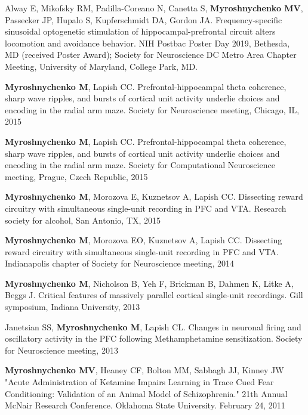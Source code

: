 \documentclass[10pt]{article}
\makeatletter
\newlength{\bibhang}
\newlength{\bibsep}
 {\@listi \global\bibsep\itemsep \global\advance\bibsep by\parsep}
\newenvironment{bibsection}%
        {\vspace{-\baselineskip}\begin{list}{}{%
       \setlength{\leftmargin}{\bibhang}%
       \setlength{\itemindent}{-\leftmargin}%
       \setlength{\itemsep}{\bibsep}%
       \setlength{\parsep}{\z@}%
        \setlength{\partopsep}{0pt}%
        \setlength{\topsep}{0pt}}}
        {\end{list}\vspace{-.6\baselineskip}}
\makeatother
\begin{document}
\begin{bibsection}
\item Alway E, Mikofsky RM, Padilla-Coreano N, Canetta S, {\bf Myroshnychenko MV},\\  Passecker JP, Hupalo S, Kupferschmidt DA, Gordon JA.
  Frequency-specific sinusoidal optogenetic stimulation of hippocampal-prefrontal circuit alters locomotion and avoidance behavior. NIH Postbac Poster Day 2019, Bethesda, MD (received Poster Award);
Society for Neuroscience DC Metro Area Chapter Meeting, University of Maryland, College Park, MD.

\item {\bf Myroshnychenko M},  Lapish CC. Prefrontal-hippocampal theta coherence, sharp wave ripples, and bursts of cortical unit activity underlie choices and encoding in the radial arm maze. Society for Neuroscience meeting, Chicago, IL, 2015

\item {\bf Myroshnychenko M},  Lapish CC. Prefrontal-hippocampal theta coherence, sharp wave ripples, and bursts of cortical unit activity underlie choices and encoding in the radial arm maze. Society for Computational Neuroscience meeting, Prague, Czech Republic, 2015

\item {\bf Myroshnychenko M}, Morozova E, Kuznetsov A, Lapish CC. Dissecting reward circuitry with simultaneous single-unit recording in PFC and VTA. Research society for alcohol, San Antonio, TX, 2015

\item {\bf Myroshnychenko M}, Morozova EO,  Kuznetsov A, Lapish CC. Dissecting reward circuitry with simultaneous single-unit recording in PFC and VTA. Indianapolis chapter of Society for Neuroscience meeting, 2014

\item {\bf Myroshnychenko M},  Nicholson B,  Yeh F,  Brickman B,  Dahmen K,  Litke A,  Beggs J. Critical features of massively parallel cortical single-unit recordings. Gill symposium, Indiana University, 2013


\item Janetsian SS, {\bf Myroshnychenko M}, Lapish CL. Changes in neuronal firing and oscillatory activity in the PFC following Methamphetamine sensitization. Society for Neuroscience meeting, 2013

\item {\bf Myroshnychenko MV}, Heaney CF, Bolton MM, Sabbagh JJ, Kinney JW  "Acute Administration of Ketamine Impairs Learning in
	Trace Cued Fear Conditioning: Validation of an Animal Model
	of Schizophrenia."  21th Annual McNair Research Conference. Oklahoma State University. February 24, 2011


\end{bibsection}
\end{document}
